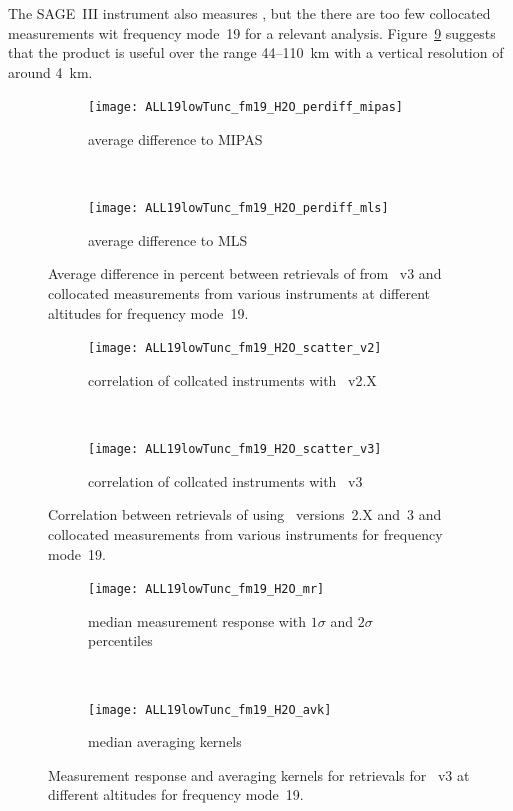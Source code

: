 The SAGE~III instrument also measures , but the there are too few
collocated measurements wit frequency mode~19 for a relevant analysis.
Figure~\ref{fig:fm19:H2O:mr_avk} suggests that the product is useful over the
range 44--110~km with a vertical resolution of around 4~km.

\begin{figure}[tbhp]
    \centering
    \begin{subfigure}[b]{0.49\textwidth}
        \texttt{[image: ALL19lowTunc\_fm19\_H2O\_perdiff\_mipas]}
        \caption{average difference to MIPAS}
        \label{fig:fm19:H2O:profiles:MIPAS}
    \end{subfigure}
    \,
    \begin{subfigure}[b]{0.49\textwidth}
        \texttt{[image: ALL19lowTunc\_fm19\_H2O\_perdiff\_mls]}
        \caption{average difference to MLS}
        \label{fig:fm19:H2O:profiles:MLS}
    \end{subfigure}
    \caption{Average difference in percent between retrievals of 
    from \smr~v3 and collocated measurements from various instruments at
    different altitudes for frequency mode~19.}

    \label{fig:fm19:H2O:profiles}
\end{figure}

\begin{figure}[tbhp]
    \centering
    \begin{subfigure}[b]{0.49\textwidth}
        \texttt{[image: ALL19lowTunc\_fm19\_H2O\_scatter\_v2]}
        \caption{correlation of collcated instruments with \smr~v2.X}
        \label{fig:fm19:H2O:scatter:v2}
    \end{subfigure}
    \,
    \begin{subfigure}[b]{0.49\textwidth}
        \texttt{[image: ALL19lowTunc\_fm19\_H2O\_scatter\_v3]}
        \caption{correlation of collcated instruments with \smr~v3}
        \label{fig:fm19:H2O:scatter:v3}
    \end{subfigure}
    \caption{Correlation between retrievals of  using \smr\
    versions~2.X and~3 and collocated measurements from various instruments
    for frequency mode~19.}
    \label{fig:fm19:H2O:scatter}
\end{figure}

\begin{figure}[tbhp]
    \centering
    \begin{subfigure}[b]{0.49\textwidth}
        \texttt{[image: ALL19lowTunc\_fm19\_H2O\_mr]}
        \caption{median measurement response with $1\sigma$ and $2\sigma$
        percentiles}
        \label{fig:fm19:H2O:mr}
    \end{subfigure}
    \,
    \begin{subfigure}[b]{0.49\textwidth}
        \texttt{[image: ALL19lowTunc\_fm19\_H2O\_avk]}
        \caption{median averaging kernels\newline~}
        \label{fig:fm19:H2O:avk}
    \end{subfigure}
    \caption{Measurement response and averaging kernels for 
    retrievals for \smr~v3 at different altitudes for frequency mode~19.}
    \label{fig:fm19:H2O:mr_avk}
\end{figure}


